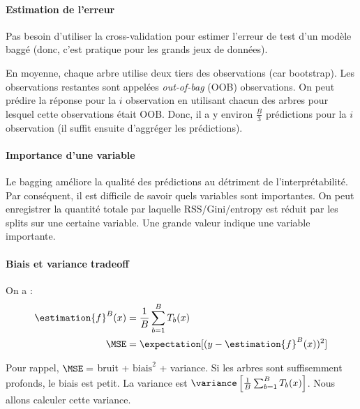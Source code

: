             \paragraph{Estimation de l'erreur}
                Pas besoin d'utiliser la cross-validation pour estimer l'erreur de test d'un modèle baggé (donc, c'est pratique pour les grands jeux de données).

                En moyenne, chaque arbre utilise deux tiers des observations (car bootstrap). Les observations restantes sont appelées \textit{out-of-bag} (OOB) observations. On peut prédire la réponse pour la \(i\)\ieme{} observation en utilisant chacun des arbres pour lesquel cette observations était OOB. Donc, il a y environ \(\frac{B}{3}\) prédictions pour la \(i\)\ieme{} observation (il suffit ensuite d'aggréger les prédictions).

            \paragraph{Importance d'une variable}
                Le bagging améliore la qualité des prédictions au détriment de l'interprétabilité. Par conséquent, il est difficile de savoir quels variables sont importantes. On peut enregistrer la quantité totale par laquelle RSS/Gini/entropy est réduit par les splits sur une certaine variable. Une grande valeur indique une variable importante.

            \paragraph{Biais et variance tradeoff}
                On a :
                \begin{align*}
                    \estimation{f}^B (x) &= \frac{1}{B} \sum_{b = 1}^B T_b(x)\\
                    \MSE &= \expectation[(y - \estimation{f}^B(x))^2]\\
                \end{align*}

                Pour rappel, \(\MSE = \) bruit + \(\text{biais}^2\) + variance. Si les arbres sont suffisemment profonds, le biais est petit. La variance est \(\variance\left[\frac{1}{B} \sum_{b = 1}^B T_b(x)\right]\). Nous allons calculer cette variance.

